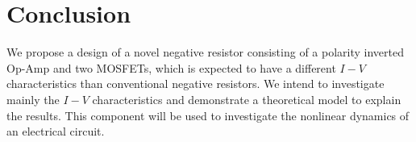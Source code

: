 \documentclass[12pt]{article}
\begin{document}
\section{Conclusion}


We propose a design of a novel negative resistor consisting of a polarity inverted Op-Amp and two MOSFETs, which is expected to have a different \(I-V\) characteristics than conventional negative resistors. We intend to investigate mainly the \(I-V\) characteristics and demonstrate a theoretical model to explain the results. This component will be used to investigate the nonlinear dynamics of an electrical circuit.


\end{document}
